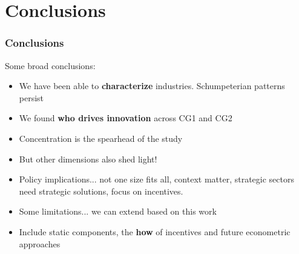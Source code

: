 \documentclass{beamer}
\begin{document}
\section{Conclusions}
	\begin{frame}[allowframebreaks]
		\frametitle{Conclusions}
		Some broad conclusions:
		\begin{itemize}
			\item We have been able to \textbf{characterize} industries. Schumpeterian patterns persist
			\item We found \textbf{who drives innovation} across CG1 and CG2
			\item Concentration is the spearhead of the study
			\item But other dimensions also shed light!
			\item Policy implications... not one size fits all, context matter, strategic sectors need strategic solutions, focus on incentives.
			\framebreak
			\item Some limitations... we can extend based on this work
			\item Include static components, the \textbf{how} of incentives and future econometric approaches
		\end{itemize}
	\end{frame}
\end{document}
